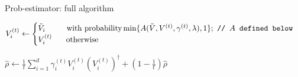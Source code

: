 \documentclass{beamer}
\begin{document}
\begin{frame}{Prob-estimator: full algorithm}
\begin{algorithm}[H]
{{               
    
                $V_i^{(t)} \gets \begin{cases}
    
                    \tilde V_i \hspace{0.96cm} \text{with probability} \min\{A(\tilde V, V^{(t)}, \gamma^{(t)}, \lambda), 1\} \tcp*[l]{$A$ defined below}\\
    
                    V_i^{(t)} \hspace{0.63cm}\text{otherwise}
    
                \end{cases}$
    
            }
    
            \;
    
    
            $\hat \rho \gets \frac{1}{t}\sum_{i=1}^{d} \gamma_i^{(t)} V_i^{(t)} (V_i^{(t)})^\dagger  + (1 - \frac{1}{t})\hat \rho $
    
        }
    
        \caption{Prob-estimator algorithm}
    
    \end{algorithm}\medbreak
\end{frame}
\end{document}
